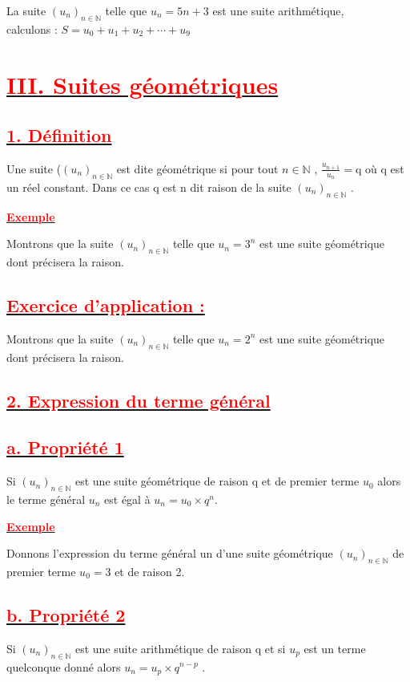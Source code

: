 \documentclass[12pt]{article}
\begin{document}
La suite $(u_{n})_{n\in\mathbb{N}}$ telle que $u_{n} = 5n + 3$ est une suite arithmétique,\\
calculons : $S = u_{0} + u_{1} + u_{2} +\cdots+u_{9}$
\section*{\underline{\textbf{\textcolor{red}{III. Suites géométriques}}}}
\subsection*{\underline{\textbf{\textcolor{red}{1. Définition}}}}
Une suite ($(u_{n})_{n\in\mathbb{N}}$ est dite géométrique si pour tout $n\in\mathbb{N}$ , 
$\frac{u_{n+1}}{u_{n}}=$q où q est un réel constant. Dans ce cas q est n dit raison de la suite $(u_{n})_{n\in\mathbb{N}}$ .

\underline{\textbf{\textcolor{red}{Exemple}}}

Montrons que la suite $(u_{n})_{n\in\mathbb{N}}$ telle que $u_{n} = 3^{n}$ est une suite géométrique dont précisera la raison.
\subsection*{\underline{\textbf{\textcolor{red}{Exercice d’application : }}}}
Montrons que la suite $(u_{n})_{n\in\mathbb{N}}$ telle que $u_{n} = 2^{n}$ est une suite géométrique dont précisera la raison.
\subsection*{\underline{\textbf{\textcolor{red}{2. Expression du terme général}}}}
\subsection*{\underline{\textbf{\textcolor{red}{a. Propriété 1}}}}
Si $(u_{n})_{n\in\mathbb{N}}$ est une suite géométrique de raison q et de premier terme $u_{0}$ alors le terme général $u_{n}$ est égal à $u_{n} = u_{0} × q^{n}$.

\underline{\textbf{\textcolor{red}{Exemple}}}

Donnons l’expression du terme général un d’une suite géométrique $(u_{n})_{n\in\mathbb{N}}$ de premier terme 
$u_{0} = 3$ et de raison 2.
\subsection*{\underline{\textbf{\textcolor{red}{b. Propriété 2}}}}
Si $(u_{n})_{n\in\mathbb{N}}$ est une suite arithmétique de raison q et si $u_{p}$ est un terme quelconque donné alors $u_{n} = u_{p} × q^{n-p}$ .
\end{document}
